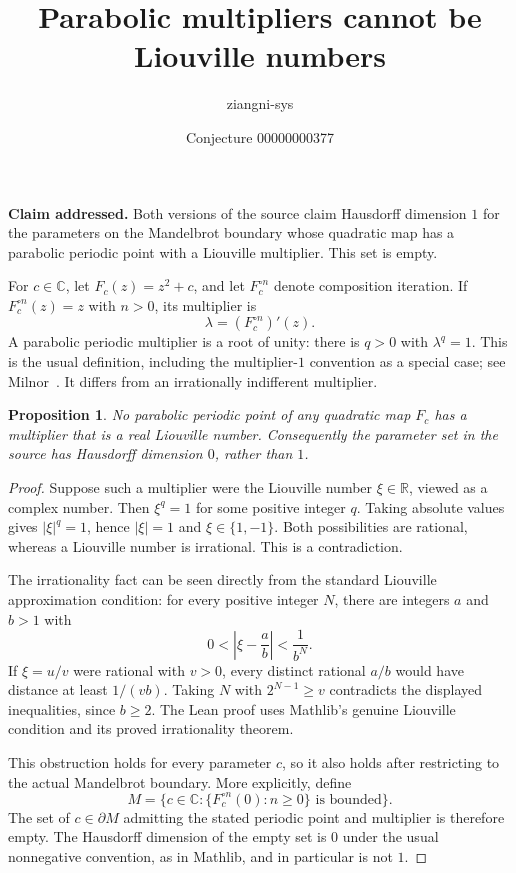 \documentclass[11pt]{article}
\title{Parabolic multipliers cannot be Liouville numbers}
\author{ziangni-sys}
\date{Conjecture 00000000377}
\newtheorem{proposition}{Proposition}
\begin{document}
\maketitle
\noindent\textbf{Claim addressed.} Both versions of the source claim Hausdorff dimension $1$ for the parameters on the Mandelbrot boundary whose quadratic map has a parabolic periodic point with a Liouville multiplier. This set is empty.

For $c\in\mathbb C$, let $F_c(z)=z^2+c$, and let $F_c^{\circ n}$ denote composition iteration. If $F_c^{\circ n}(z)=z$ with $n>0$, its multiplier is
\[
 \lambda=(F_c^{\circ n})'(z).
\]
A parabolic periodic multiplier is a root of unity: there is $q>0$ with $\lambda^q=1$. This is the usual definition, including the multiplier-$1$ convention as a special case; see Milnor~\cite{milnor}. It differs from an irrationally indifferent multiplier.

\begin{proposition}
No parabolic periodic point of any quadratic map $F_c$ has a multiplier that is a real Liouville number. Consequently the parameter set in the source has Hausdorff dimension $0$, rather than $1$.
\end{proposition}
\begin{proof}
Suppose such a multiplier were the Liouville number $\xi\in\mathbb R$, viewed as a complex number. Then $\xi^q=1$ for some positive integer $q$. Taking absolute values gives $|\xi|^q=1$, hence $|\xi|=1$ and $\xi\in\{1,-1\}$. Both possibilities are rational, whereas a Liouville number is irrational. This is a contradiction.

The irrationality fact can be seen directly from the standard Liouville approximation condition: for every positive integer $N$, there are integers $a$ and $b>1$ with
\[
 0<\left|\xi-\frac ab\right|<\frac1{b^N}.
\]
If $\xi=u/v$ were rational with $v>0$, every distinct rational $a/b$ would have distance at least $1/(vb)$. Taking $N$ with $2^{N-1}\geq v$ contradicts the displayed inequalities, since $b\geq2$. The Lean proof uses Mathlib's genuine Liouville condition and its proved irrationality theorem.

This obstruction holds for every parameter $c$, so it also holds after restricting to the actual Mandelbrot boundary. More explicitly, define
\[
 M=\{c\in\mathbb C:\{F_c^{\circ n}(0):n\geq0\}\text{ is bounded}\}.
\]
The set of $c\in\partial M$ admitting the stated periodic point and multiplier is therefore empty. The Hausdorff dimension of the empty set is $0$ under the usual nonnegative convention, as in Mathlib, and in particular is not $1$.
\end{proof}
\end{document}

